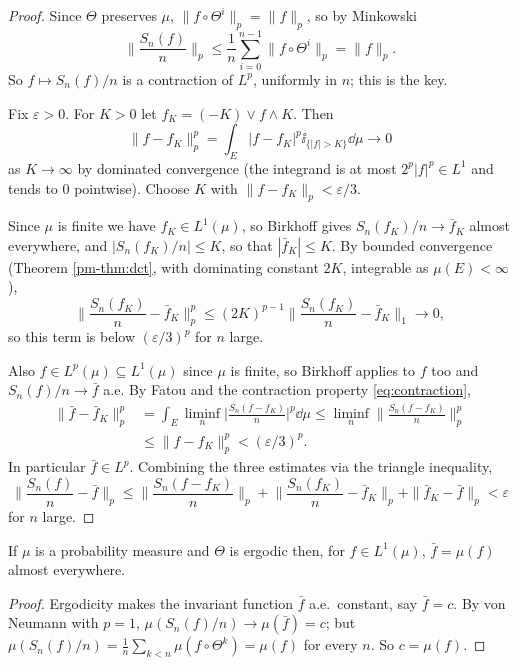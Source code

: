 \documentclass[a4paper]{scrartcl}
\newcommand{\ind}{\ii}
\begin{document}
\begin{proof}
	Since $\Theta$ preserves $\mu$, $\|f\circ\Theta^i\|_p = \|f\|_p$, so by Minkowski
	\begin{equation}\label{eq:contraction}
		\Big\|\frac{S_n(f)}{n}\Big\|_p \leq \frac1n\sum_{i=0}^{n-1}\|f\circ\Theta^i\|_p = \|f\|_p. \tag{$\sharp$}
	\end{equation}
	So $f \mapsto S_n(f)/n$ is a contraction of $L^p$, uniformly in $n$; this is the key.

	Fix $\varepsilon>0$. For $K>0$ let $f_K = (-K)\vee f\wedge K$. Then
	$$
	\|f-f_K\|_p^p = \int_E |f-f_K|^p\ind_{\{|f|>K\}}\dd\mu \longrightarrow 0
	$$
	as $K \to\infty$ by dominated convergence (the integrand is at most $2^p|f|^p \in L^1$ and tends to $0$ pointwise). Choose $K$ with $\|f-f_K\|_p<\varepsilon/3$.

	Since $\mu$ is finite we have $f_K \in L^1(\mu)$, so Birkhoff gives $S_n(f_K)/n \to \bar f_K$ almost everywhere, and $|S_n(f_K)/n|\leq K$, so that $|\bar f_K|\leq K$. By bounded convergence (Theorem \ref{pm-thm:dct}, with dominating constant $2K$, integrable as $\mu(E)<\infty$),
	$$
	\Big\|\frac{S_n(f_K)}{n}-\bar f_K\Big\|_p^p \leq (2K)^{p-1}\Big\|\frac{S_n(f_K)}{n}-\bar f_K\Big\|_1 \longrightarrow 0,
	$$
	so this term is below $(\varepsilon/3)^p$ for $n$ large.

	Also $f \in L^p(\mu)\subseteq L^1(\mu)$ since $\mu$ is finite, so Birkhoff applies to $f$ too and $S_n(f)/n \to \bar f$ a.e. By Fatou and the contraction property \eqref{eq:contraction},
	\begin{align*}
		\|\bar f - \bar f_K\|_p^p &= \int_E \liminf_n \Big|\frac{S_n(f-f_K)}{n}\Big|^p\dd\mu \leq \liminf_n \Big\|\frac{S_n(f-f_K)}{n}\Big\|_p^p\\
		&\leq \|f-f_K\|_p^p<(\varepsilon/3)^p.
	\end{align*}
	In particular $\bar f \in L^p$. Combining the three estimates via the triangle inequality,
	$$
	\Big\|\frac{S_n(f)}{n}-\bar f\Big\|_p \leq \Big\|\frac{S_n(f-f_K)}{n}\Big\|_p + \Big\|\frac{S_n(f_K)}{n}-\bar f_K\Big\|_p+\|\bar f_K-\bar f\|_p<\varepsilon
	$$
	for $n$ large.
\end{proof}

\begin{corollary}\label{cor:mean-identified}
	If $\mu$ is a probability measure and $\Theta$ is ergodic then, for $f \in L^1(\mu)$, $\bar f = \mu(f)$ almost everywhere.
\end{corollary}
\begin{proof}
	Ergodicity makes the invariant function $\bar f$ a.e.\ constant, say $\bar f = c$. By von Neumann with $p=1$, $\mu(S_n(f)/n)\to\mu(\bar f)=c$; but $\mu(S_n(f)/n)=\frac1n\sum_{k<n}\mu(f\circ\Theta^k)=\mu(f)$ for every $n$. So $c = \mu(f)$.
\end{proof}
\end{document}
